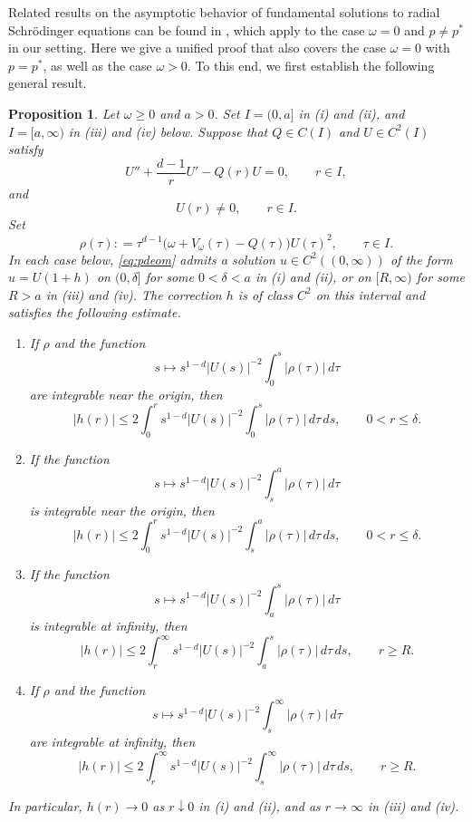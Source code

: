 \documentclass[12pt, a4paper, reqno]{amsart}
\numberwithin{equation}{section}
\newtheorem{proposition}[theorem]{Proposition}
\theoremstyle{definition}
\theoremstyle{remark}
\newcommand{\ce}{\mathrel{\mathop:}=}
\begin{document}
Related results on the asymptotic behavior of fundamental solutions
to radial Schr\"odinger equations can be found in \cite{IKO17},
which apply to the case $\omega=0$ and $p\ne p^*$ in our setting.
Here we give a unified proof that also covers the case $\omega=0$ with $p=p^*$, as well as the case $\omega>0$.
To this end, we first establish the following general result.
\begin{proposition}\label{prop:ode}
Let $\omega\ge0$ and $a>0$. Set $I=(0,a]$ in \textup{(i)} and
\textup{(ii)}, and $I=[a,\infty)$ in \textup{(iii)} and
\textup{(iv)} below. Suppose that $Q\in C(I)$ and $U\in C^2(I)$ satisfy
\begin{equation}\label{eq:gweq}
  U''+\frac{d-1}{r}U'-Q(r)U=0,\qquad r\in I,
\end{equation}
and
\[
  U(r)\ne0,\qquad r\in I.
\]
Set
\[
  \rho(\tau)
  \ce \tau^{d-1}
    \bigl(\omega+V_\omega(\tau)-Q(\tau)\bigr)U(\tau)^2,
  \qquad \tau\in I.
\]
In each case below, \eqref{eq:pdeom} admits a solution
$u\in C^2((0,\infty))$ of the form $u=U(1+h)$
on $(0,\delta]$ for some $0<\delta<a$ in \textup{(i)} and
\textup{(ii)}, or on $[R,\infty)$ for some $R>a$ in
\textup{(iii)} and \textup{(iv)}.
The correction $h$ is of class
$C^2$ on this interval and satisfies the following estimate.

\begin{enumerate}
\item
If $\rho$ and the function
\[
  s\mapsto
  s^{1-d}|U(s)|^{-2}\int_0^s|\rho(\tau)|\,d\tau
\]
are integrable near the origin, then
\[
  |h(r)|
  \le
  2\int_0^r s^{1-d}|U(s)|^{-2}
    \int_0^s|\rho(\tau)|\,d\tau\,ds,
  \qquad 0<r\le\delta.
\]

\item
If the function
\[
  s\mapsto
  s^{1-d}|U(s)|^{-2}\int_s^a|\rho(\tau)|\,d\tau
\]
is integrable near the origin, then
\[
  |h(r)|
  \le
  2\int_0^r s^{1-d}|U(s)|^{-2}
    \int_s^a|\rho(\tau)|\,d\tau\,ds,
  \qquad 0<r\le\delta.
\]

\item
If the function
\[
  s\mapsto
  s^{1-d}|U(s)|^{-2}\int_a^s|\rho(\tau)|\,d\tau
\]
is integrable at infinity, then
\[
  |h(r)|
  \le
  2\int_r^\infty s^{1-d}|U(s)|^{-2}
    \int_a^s|\rho(\tau)|\,d\tau\,ds,
  \qquad r\ge R.
\]

\item
If $\rho$ and the function
\[
  s\mapsto
  s^{1-d}|U(s)|^{-2}\int_s^\infty|\rho(\tau)|\,d\tau
\]
are integrable at infinity, then
\[
  |h(r)|
  \le
  2\int_r^\infty s^{1-d}|U(s)|^{-2}
    \int_s^\infty|\rho(\tau)|\,d\tau\,ds,
  \qquad r\ge R.
\]
\end{enumerate}
In particular, $h(r)\to0$ as $r\downarrow0$ in \textup{(i)}
and \textup{(ii)}, and as $r\to\infty$ in \textup{(iii)}
and \textup{(iv)}.
\end{proposition}
\end{document}
